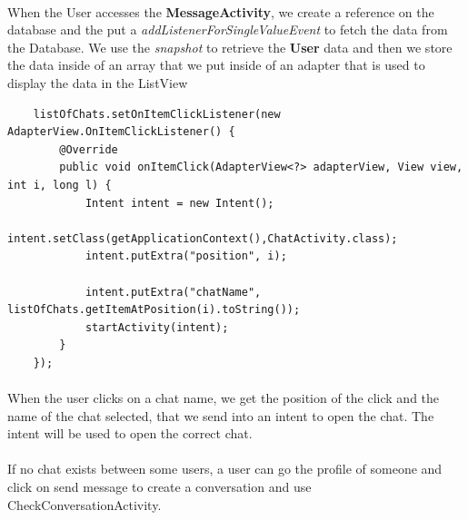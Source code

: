 \documentclass[paper=a4, fontsize=12pt,DIV=14]{scrartcl}    %
\begin{document}
\paragraph{} When the User accesses the \textbf{MessageActivity}, we create a reference on the database and the put a \textit{addListenerForSingleValueEvent} to fetch the data from the Database. We use the \textit{snapshot} to retrieve the \textbf{User} data and then we store the data inside of an array that we put inside of an adapter that is used to display the data in the ListView
\begin{lstlisting}
    listOfChats.setOnItemClickListener(new AdapterView.OnItemClickListener() {
        @Override
        public void onItemClick(AdapterView<?> adapterView, View view, int i, long l) {
            Intent intent = new Intent();
            intent.setClass(getApplicationContext(),ChatActivity.class);
            intent.putExtra("position", i);

            intent.putExtra("chatName", listOfChats.getItemAtPosition(i).toString());
            startActivity(intent);
        }
    });

        	\end{lstlisting}

        	\paragraph{}When the user clicks on a chat name, we get the position of the click and the name of the chat selected, that we send into an intent to open the chat. The intent will be used to open the correct chat.
			\paragraph{}If no chat exists between some users, a user can go the profile of someone and click on send message to create a conversation and use CheckConversationActivity.
\end{document}
